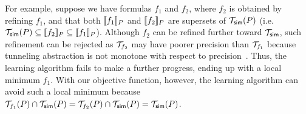 For example, suppose we have formulas $f_1$ and $f_2$, where $f_2$ is
obtained by refining $f_1$, and that both $[\![f_1]\!]_{P}$ and
$[\![f_2]\!]_{P}$ are supersets of $\mathcal{T}_{{\sf sim}}(P)$
(i.e.
$\mathcal{T}_{{\sf sim}}(P) \subseteq [\![f_2]\!]_{P} \subseteq [\![f_1]\!]_{P}
$). Although $f_2$ can be refined further toward $\mathcal{T}_{{\sf sim}}$,
such refinement can be rejected as $\mathcal{T}_{f_2}$ may have poorer
precision than $\mathcal{T}_{f_1}$ because tunneling abstraction is not
monotone with respect to precision~\cite{JeJeOh18}. Thus, the 
learning algorithm fails to make a further progress, ending up with a
local minimum $f_1$.  With our objective function, 
however, the learning algorithm can avoid such a local minimum because
$\mathcal{T}_{f_1}(P) \cap \mathcal{T}_{{\sf sim}}(P) =
\mathcal{T}_{f_2}(P) \cap \mathcal{T}_{{\sf sim}}(P) = \mathcal{T}_{{\sf sim}}(P)$. 




